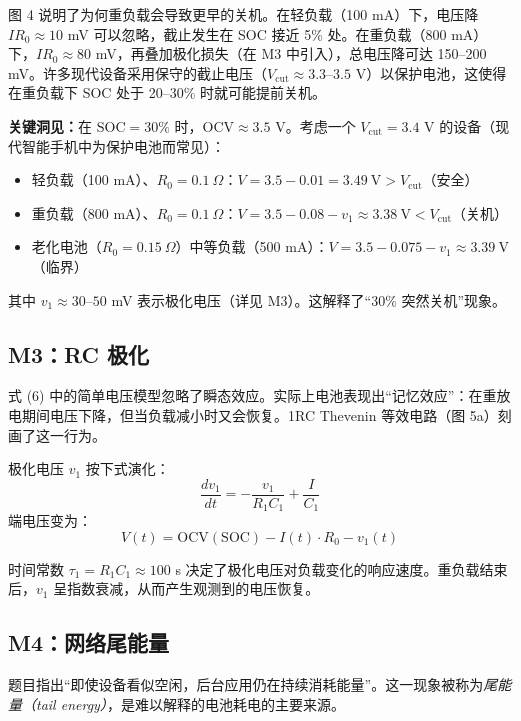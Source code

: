 \documentclass[11pt,a4paper]{ctexart}
\begin{document}
图 4 说明了为何重负载会导致更早的关机。在轻负载（100 mA）下，电压降 $IR_0 \approx 10$ mV 可以忽略，截止发生在 SOC 接近 5\% 处。在重负载（800 mA）下，$IR_0 \approx 80$ mV，再叠加极化损失（在 M3 中引入），总电压降可达 150--200 mV。许多现代设备采用保守的截止电压（$V_{\mathrm{cut}} \approx 3.3$--$3.5$ V）以保护电池，这使得在重负载下 SOC 处于 20--30\% 时就可能提前关机。

\textbf{关键洞见：}在 $\mathrm{SOC} = 30\%$ 时，$\mathrm{OCV} \approx 3.5$ V。考虑一个 $V_{\mathrm{cut}} = 3.4$ V 的设备（现代智能手机中为保护电池而常见）：
\begin{itemize}[leftmargin=2em]
\item 轻负载（100 mA）、$R_0 = 0.1\ \Omega$：$V = 3.5 - 0.01 = 3.49\ \mathrm{V} > V_{\mathrm{cut}}$（安全）
\item 重负载（800 mA）、$R_0 = 0.1\ \Omega$：$V = 3.5 - 0.08 - v_1 \approx 3.38\ \mathrm{V} < V_{\mathrm{cut}}$（关机）
\item 老化电池（$R_0 = 0.15\ \Omega$）中等负载（500 mA）：$V = 3.5 - 0.075 - v_1 \approx 3.39\ \mathrm{V}$（临界）
\end{itemize}
其中 $v_1 \approx 30$--$50$ mV 表示极化电压（详见 M3）。这解释了“30\% 突然关机”现象。

\subsection{M3：RC 极化}

式 (6) 中的简单电压模型忽略了瞬态效应。实际上电池表现出“记忆效应”：在重放电期间电压下降，但当负载减小时又会恢复。1RC Thevenin 等效电路（图 5a）刻画了这一行为。

极化电压 $v_1$ 按下式演化：
\begin{equation}
\frac{dv_1}{dt} = -\frac{v_1}{R_1 C_1} + \frac{I}{C_1}
\end{equation}
端电压变为：
\begin{equation}
V(t) = \mathrm{OCV}(\mathrm{SOC}) - I(t)\cdot R_0 - v_1(t)
\end{equation}

时间常数 $\tau_1 = R_1 C_1 \approx 100$ s 决定了极化电压对负载变化的响应速度。重负载结束后，$v_1$ 呈指数衰减，从而产生观测到的电压恢复。

\subsection{M4：网络尾能量}

题目指出“即使设备看似空闲，后台应用仍在持续消耗能量”。这一现象被称为\textit{尾能量（tail energy）}，是难以解释的电池耗电的主要来源。
\end{document}
